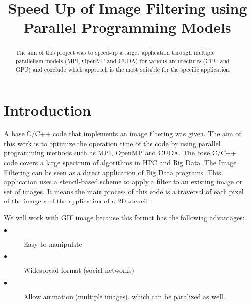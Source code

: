\documentclass[conference,compsoc]{IEEEtran}
\begin{document}
\title{Speed Up of Image Filtering using Parallel Programming Models}
\author{
\and
{}
}

\maketitle

\begin{abstract}
The aim of this project was to speed-up a target application through multiple parallelism models (MPI, OpenMP and CUDA) for various architectures (CPU and GPU) and conclude which approach is the most suitable for the specific application. 
\end{abstract}
\IEEEpeerreviewmaketitle

\section{Introduction}
A base C/C++ code that implements an image filtering was given. The aim of this work is to optimize the operation time of the code by using parallel programming methods such as MPI, OpenMP and CUDA.
The base C/C++ code covers a large spectrum of algorithms in HPC and Big Data. The Image Filtering can be seen as a direct application of Big Data programs. This application uses a stencil-based scheme to apply a filter to an existing image or set of images. It means the main process of this code is a traversal of each pixel of the image and the application of a 2D stencil \cite{CoursePage}.

We will work with GIF image because this format has the following advantages:
\begin{description}
	\item[$\bullet$] Easy to manipulate
	\item[$\bullet$] Widespread format (social networks)
	\item[$\bullet$] Allow animation (multiple images). which can be paralized as well.
\end{description}
\end{document}
